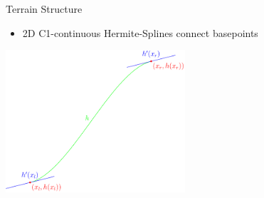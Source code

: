 
\begin{frame}{Terrain Structure}
    \begin{itemize}
        \item 2D C1-continuous Hermite-Splines connect basepoints
    \end{itemize}
    \centering
    \includegraphics[width=0.5\textwidth]{../figures/terrain/splines/SplinePiece.pdf} %

\end{frame}

